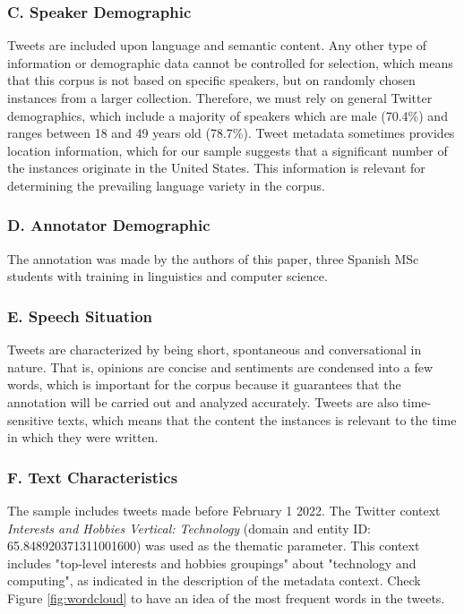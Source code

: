 \documentclass[11pt,a4paper]{article}
\begin{document}
\subsubsection*{C. Speaker Demographic}
Tweets are included upon language and semantic content. Any other type of information or demographic data cannot be controlled for selection, which means that this corpus is not based on specific speakers, but on randomly chosen instances from a larger collection.
Therefore, we must rely on general Twitter demographics, which include a majority of speakers which are male (70.4\%) and ranges between 18 and 49 years old (78.7\%). Tweet metadata sometimes provides location information, which for our sample suggests that a significant number of the instances originate in the United States. This information is relevant for determining the prevailing language variety in the corpus.

\subsubsection*{D. Annotator Demographic}
The annotation was made by the authors of this paper, three Spanish MSc students with training in linguistics and computer science.

\subsubsection*{E. Speech Situation}
Tweets are characterized by being short, spontaneous and conversational in nature. That is, opinions are concise and sentiments are condensed into a few words, which is important for the corpus because it guarantees that the annotation will be carried out and analyzed accurately. Tweets are also time-sensitive texts, which means that the content the instances is relevant to the time in which they were written.

\subsubsection*{F. Text Characteristics}
The sample includes tweets made before February 1 2022. The Twitter context \textit{Interests and Hobbies Vertical: Technology} (domain and entity ID: 65.848920371311001600) was used as the thematic parameter. This context includes "top-level interests and hobbies groupings" about "technology and computing", as indicated in the description of the metadata context. Check Figure \ref{fig:wordcloud} to have an idea of the most frequent words in the tweets.
\end{document}
